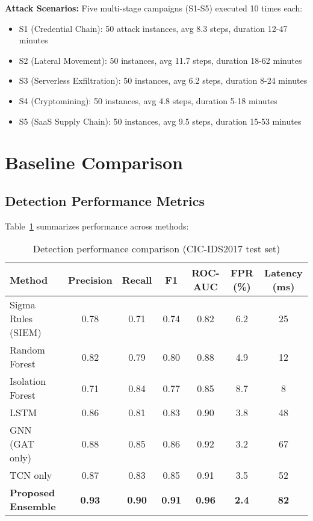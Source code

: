 \textbf{Attack Scenarios:} Five multi-stage campaigns (S1-S5) executed 10 times each:
\begin{itemize}
    \item S1 (Credential Chain): 50 attack instances, avg 8.3 steps, duration 12-47 minutes
    \item S2 (Lateral Movement): 50 instances, avg 11.7 steps, duration 18-62 minutes
    \item S3 (Serverless Exfiltration): 50 instances, avg 6.2 steps, duration 8-24 minutes
    \item S4 (Cryptomining): 50 instances, avg 4.8 steps, duration 5-18 minutes
    \item S5 (SaaS Supply Chain): 50 instances, avg 9.5 steps, duration 15-53 minutes
\end{itemize}

\section{Baseline Comparison}\label{sec:eval-baseline}
\subsection{Detection Performance Metrics}
Table~\ref{tab:baseline-comparison} summarizes performance across methods:

\begin{table}[H]
\centering
\caption{Detection performance comparison (CIC-IDS2017 test set)}
\label{tab:baseline-comparison}
\begin{tabular}{lcccccc}
\toprule
\textbf{Method} & \textbf{Precision} & \textbf{Recall} & \textbf{F1} & \textbf{ROC-AUC} & \textbf{FPR (\%)} & \textbf{Latency (ms)} \\
\midrule
Sigma Rules (SIEM) & 0.78 & 0.71 & 0.74 & 0.82 & 6.2 & 25 \\
Random Forest & 0.82 & 0.79 & 0.80 & 0.88 & 4.9 & 12 \\
Isolation Forest & 0.71 & 0.84 & 0.77 & 0.85 & 8.7 & 8 \\
LSTM & 0.86 & 0.81 & 0.83 & 0.90 & 3.8 & 48 \\
GNN (GAT only) & 0.88 & 0.85 & 0.86 & 0.92 & 3.2 & 67 \\
TCN only & 0.87 & 0.83 & 0.85 & 0.91 & 3.5 & 52 \\
\midrule
\textbf{Proposed Ensemble} & \textbf{0.93} & \textbf{0.90} & \textbf{0.91} & \textbf{0.96} & \textbf{2.4} & \textbf{82} \\
\bottomrule
\end{tabular}
\end{table}

